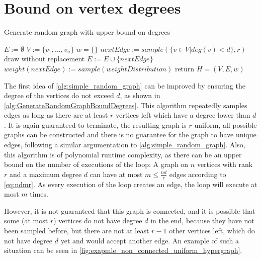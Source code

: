 \section{Bound on vertex degrees}
\begin{algorithm}
	\caption{Generate random graph with upper bound on degrees\label{alg:GenerateRandomGraphBoundDegrees}} 
	\begin{algorithmic}
		\State $E := \emptyset$
		\State $V := \{v_1, \ldots, v_n\}$
		\State $w = \{\}$
		\State $nextEdge := sample(\{v\in V| deg(v)< d\}, r) $ \Comment draw without replacement
		\State $E := E \cup \{nextEdge\}$
		\State $weight(nextEdge) := sample(weightDistribution)$ 
		\EndWhile
		\State  return $H = (V, E, w)$
		\EndFunction
	\end{algorithmic}
\end{algorithm}	
The first idea of \cref{alg:simple_random_graph} can be improved by ensuring the degree of the vertices do not exceed $d$, as shown in \cref{alg:GenerateRandomGraphBoundDegrees}. This algorithm repeatedly samples edges as long as there are at least $r$ vertices left which have a degree lower than $d$. It is again guaranteed to terminate, the resulting graph is $r$-uniform, all possible graphs can be constructed and there is no guarantee for the graph to have unique edges, following a similar argumentation to \cref{alg:simple_random_graph}. Also, this algorithm is of polynomial runtime complexity, as there can be an upper bound on the number of executions of the loop: A graph on $n$ vertices with rank $r$ and a maximum degree $d$ can have at most $m \le \frac{nd}{r}$ edges according to \cref{eq:ndmr}. As every execution of the loop creates an edge, the loop will execute at most $m$ times. 



However, it is not guaranteed that this graph is connected, and it is possible that some (at most $ r$) vertices do not have degree $d$ in the end, because they have not been sampled before, but there are not at least $r-1$ other vertices left, which do not have degree $d$ yet and would accept another edge. An example of such a situation can be seen in \cref{fig:exapmle_non_connected_uniform_hypergraph}.


